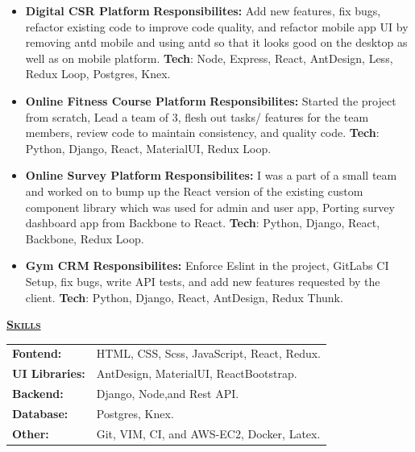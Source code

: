 \documentclass[11pt, a4paper]{article}
\begin{document}
\begin{flushleft}
\begin{itemize}
    \item {\bf{Digital CSR Platform}}
    \newline
    \textbf{Responsibilites:} Add new features, fix bugs, refactor existing code to improve code quality, and refactor mobile app UI by removing antd mobile and using antd so that it looks good on the desktop as well as on mobile platform.
    \newline
    \textbf{Tech}: Node, Express, React, AntDesign, Less, Redux Loop, Postgres, Knex. 

    \item \textbf{Online Fitness Course Platform}
    \newline
    \textbf{Responsibilites:} Started the project from scratch, Lead a team of 3, flesh out tasks/ features for the team members, review code to maintain consistency, and quality code.
    \newline
    \textbf{Tech}: Python, Django, React, MaterialUI, Redux Loop.

    \item \textbf{Online Survey Platform}
    \newline
    \textbf{Responsibilites:} I was a part of a small team and worked on to bump up the React version of the existing custom component library which was used for admin and user app, Porting survey dashboard app from Backbone to React.
    \newline
    \textbf{Tech}: Python, Django, React, Backbone, Redux Loop.

    \item \textbf{Gym CRM}
    \newline
    \textbf{Responsibilites:} Enforce Eslint in the project, GitLabs CI Setup, fix bugs, write API tests, and add new features requested by the client.
    \newline
    \textbf{Tech}: Python, Django, React, AntDesign, Redux Thunk.
    \newline
\end{itemize}

\end{flushleft}

\begin{flushleft}
    \uline{\textsc{\large{\textbf{Skills}}}\hfill}
    \newline
    \newline
    \begin{tabular}{l l}
        \textbf{Fontend: } & HTML, CSS, Scss, JavaScript, React, Redux.\\
        \textbf{UI Libraries: } & AntDesign, MaterialUI, ReactBootstrap.\\
        \textbf{Backend: } & Django, Node,and Rest API.\\
        \textbf{Database: } & Postgres, Knex.\\
        \textbf{Other: } & Git, VIM, CI, and AWS-EC2, Docker, Latex.\\
    \end{tabular}
    \newline
\end{flushleft}
\end{document}
